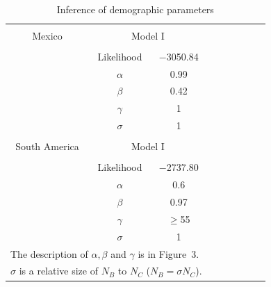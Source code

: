 \documentclass[onecolumn,oneside,letterpaper]{article}
\begin{document}
\clearpage




\renewcommand{\arraystretch}{1.1}
\begin{table}[tb]

\begin{center}
 \caption[]{Inference of demographic parameters\hspace*{0.3cm}}
  \textbf{}\\[-2mm]
{\fontsize{8}{11}\sf
    \begin{tabular}{ccccccccl} \hline
       & & \\[-3mm]
     Mexico  & \multicolumn{2}{c}{Model I}  \\[0.1cm]
    \hline
    & & \\[-3mm]
   & Likelihood & $-$3050.84  \\
  &$\alpha$ & 0.99 \\
  &$\beta$ & 0.42 \\ 
  &$\gamma$   & 1        \\ 
  & $\sigma$ & 1\\
      \hline
    & & \\[-3mm]
    South America  & \multicolumn{2}{c}{Model I}  \\[0.1cm]
        \hline
    & & \\[-3mm]
     & Likelihood &  $-$2737.80  \\
       &$\alpha$ & 0.6 \\
      &$\beta$ & 0.97           \\ 
      &$\gamma$   & $\geq$55   \\
        & $\sigma$ & 1\\ [1mm]
    \hline
\multicolumn{3}{l}{The description of $\alpha, \beta$ and $\gamma$ is in Figure~3.}\\
\multicolumn{3}{l}{$\sigma$ is a relative size of $N_B$ to $N_C$ ($N_B=\sigma N_C$).}\\
    \end{tabular}
    \label{param}  %
}
\end{center}
\end{table}
\renewcommand{\arraystretch}{1}
\end{document}
